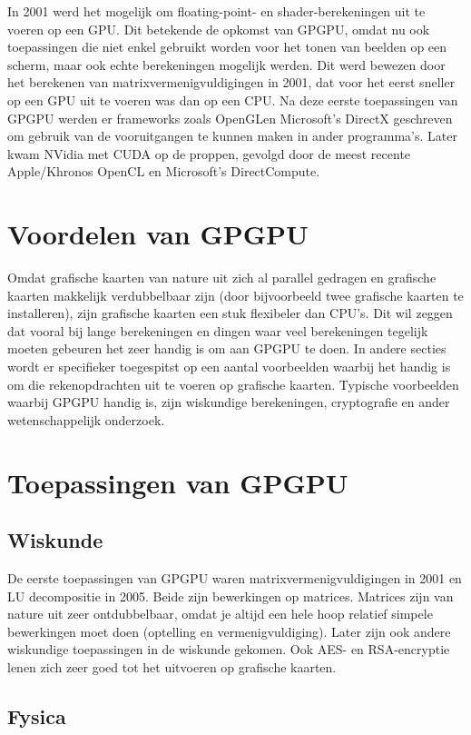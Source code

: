 \documentclass[11pt, a4paper]{article}
\begin{document}
In 2001 werd het mogelijk om floating-point- en shader-berekeningen uit te voeren op een GPU. Dit betekende de opkomst van GPGPU, omdat nu ook toepassingen die niet enkel gebruikt worden voor het tonen van beelden op een scherm, maar ook echte berekeningen mogelijk werden. Dit werd bewezen door het berekenen van matrixvermenigvuldigingen in 2001, dat voor het eerst sneller op een GPU uit te voeren was dan op een CPU. Na deze eerste toepassingen van GPGPU werden er frameworks zoals OpenGLen Microsoft's DirectX geschreven om gebruik van de vooruitgangen te kunnen maken in ander programma's. Later kwam NVidia met CUDA op de proppen, gevolgd door de meest recente Apple/Khronos OpenCL en Microsoft's DirectCompute. 

\section{Voordelen van GPGPU}

Omdat grafische kaarten van nature uit zich al parallel gedragen en grafische kaarten makkelijk verdubbelbaar zijn (door bijvoorbeeld twee grafische kaarten te installeren), zijn grafische kaarten een stuk flexibeler dan CPU's. Dit wil zeggen dat vooral bij lange berekeningen en dingen waar veel berekeningen tegelijk moeten gebeuren het zeer handig is om aan GPGPU te doen. In andere secties wordt er specifieker toegespitst op een aantal voorbeelden waarbij het handig is om die rekenopdrachten uit te voeren op grafische kaarten. Typische voorbeelden waarbij GPGPU handig is, zijn wiskundige berekeningen, cryptografie en ander wetenschappelijk onderzoek.

\section{Toepassingen van GPGPU}
\subsection{Wiskunde}

De eerste toepassingen van GPGPU waren matrixvermenigvuldigingen in 2001 en LU decompositie in 2005. Beide zijn bewerkingen op matrices. Matrices zijn van nature uit zeer ontdubbelbaar, omdat je altijd een hele hoop relatief simpele bewerkingen moet doen (optelling en vermenigvuldiging). Later zijn ook andere wiskundige toepassingen in de wiskunde gekomen. Ook AES- en RSA-encryptie lenen zich zeer goed tot het uitvoeren op grafische kaarten.

\subsection{Fysica}
\end{document}
